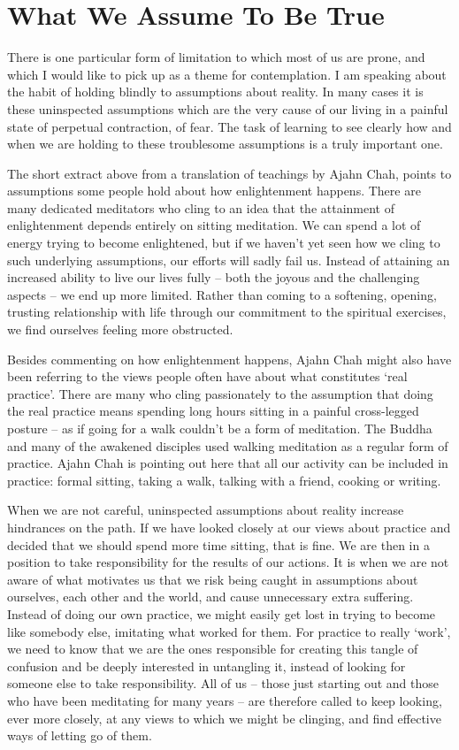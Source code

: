 \section{What We Assume To Be True}

There is one particular form of limitation to which most of us are
prone, and which I would like to pick up as a theme for contemplation. I
am speaking about the habit of holding blindly to assumptions about
reality. In many cases it is these uninspected assumptions which are the
very cause of our living in a painful state of perpetual contraction, of
fear. The task of learning to see clearly how and when we are holding to
these troublesome assumptions is a truly important one.

The short extract above from a translation of teachings by Ajahn Chah,
points to assumptions some people hold about how enlightenment happens.
There are many dedicated meditators who cling to an idea that the
attainment of enlightenment depends entirely on sitting meditation. We
can spend a lot of energy trying to become enlightened, but if we
haven’t yet seen how we cling to such underlying assumptions, our
efforts will sadly fail us. Instead of attaining an increased ability to
live our lives fully – both the joyous and the challenging aspects – we
end up more limited. Rather than coming to a softening, opening,
trusting relationship with life through our commitment to the spiritual
exercises, we find ourselves feeling more obstructed.

Besides commenting on how enlightenment happens, Ajahn Chah might also
have been referring to the views people often have about what
constitutes ‘real practice’. There are many who cling passionately to
the assumption that doing the real practice means spending long hours
sitting in a painful cross-legged posture – as if going for a walk
couldn’t be a form of meditation. The Buddha and many of the awakened
disciples used walking meditation as a regular form of practice. Ajahn
Chah is pointing out here that all our activity can be included in
practice: formal sitting, taking a walk, talking with a friend, cooking
or writing.

When we are not careful, uninspected assumptions about reality increase
hindrances on the path. If we have looked closely at our views about
practice and decided that we should spend more time sitting, that is
fine. We are then in a position to take responsibility for the results
of our actions. It is when we are not aware of what motivates us that we
risk being caught in assumptions about ourselves, each other and the
world, and cause unnecessary extra suffering. Instead of doing our own
practice, we might easily get lost in trying to become like somebody
else, imitating what worked for them. For practice to really ‘work’, we
need to know that we are the ones responsible for creating this tangle
of confusion and be deeply interested in untangling it, instead of
looking for someone else to take responsibility. All of us – those just
starting out and those who have been meditating for many years – are
therefore called to keep looking, ever more closely, at any views to
which we might be clinging, and find effective ways of letting go of
them.

